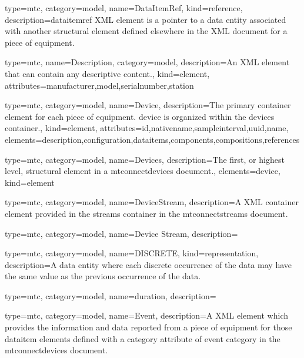 {
  type=mtc,
  category=model,
  name={DataItemRef},
  kind={reference},
  description={\gls{dataitemref} XML element is a pointer to a \gls{data entity} associated with another \gls{structural element} defined elsewhere in the XML document for a piece of equipment.}
}


{
  type=mtc,
  name={Description},
  category=model,
  description={An XML element that can contain any descriptive content.},
  kind={element},
  attributes={\gls{manufacturer},\gls{model},\gls{serialnumber},\gls{station}}
}


{
  type=mtc,
  category=model,
  name={Device},
  description={The primary container element for each piece of equipment. \gls{device} is organized within the \gls{devices}  container.},
  kind={element},
  attributes={\gls{id},\gls{nativename},\gls{sampleinterval},\gls{uuid},\gls{name}},
  elements={\gls{description},\gls{configuration},\gls{dataitems},\gls{components},\glspl{composition},\glspl{reference}}
}

{
  type=mtc,
  category=model,
  name={Devices},
  description={The first, or highest level, \gls{structural element} in a \glspl{mtconnectdevice} document.},
  elements={\gls{device}},
  kind={element}
}


{
  type=mtc,
  category=model,
  name={DeviceStream},
  description={A XML container element provided in the \glspl{stream} container in the \glspl{mtconnectstream} document.}
}


{
  type=mtc,
  category=model,
  name={Device Stream},
  description={}
}


{
  type=mtc,
  category=model,
  name={DISCRETE},
  kind={representation},
  description={A \gls{data entity} where each discrete occurrence of the data may have the same value as the previous occurrence of the data.}
}


{
  type=mtc,
  category=model,
  name={duration},
  description={}
}



{
  type=mtc,
  category=model,
  name={Event},
  description={A XML element which provides the information and data reported from a piece of equipment for those \gls{dataitem} elements defined with a \gls{category} attribute of \gls{event category} in the \glspl{mtconnectdevice} document.}
}


